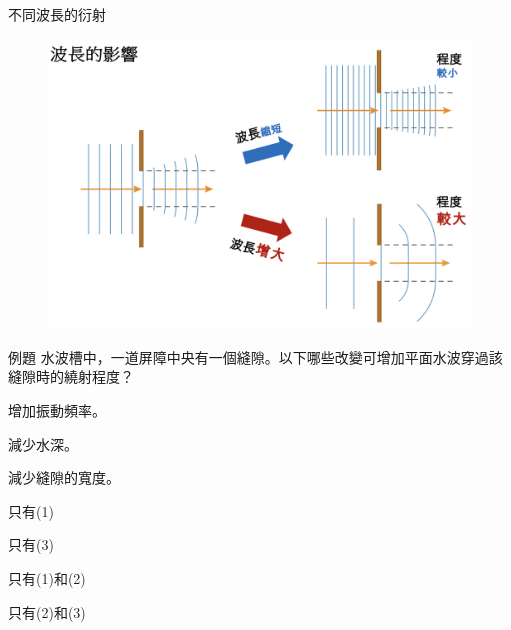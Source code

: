 \documentclass[13pt]{beamer}
\begin{document}
\begin{frame}{不同波長的衍射}
    \begin{figure}
        \centering
        \includegraphics[width=0.95\linewidth]{images/Screenshot 2023-09-27 at 9.50.14 PM.png}


    \end{figure}
\end{frame}
\begin{frame}{例題}
    水波槽中，一道屏障中央有一個縫隙。以下哪些改變可增加平面水波穿過該縫隙時的繞射程度？
    \begin{schoices}
        \item 增加振動頻率。
        \item 減少水深。
        \item 減少縫隙的寬度。
    \end{schoices}
    \begin{mchoices}
        \begin{mmc}
            \item 只有(1)
            \item 只有(3)
        \end{mmc}
        \begin{mmc}
            \item 只有(1)和(2)
            \item 只有(2)和(3)
        \end{mmc}
    \end{mchoices}

\end{frame}
\end{document}
